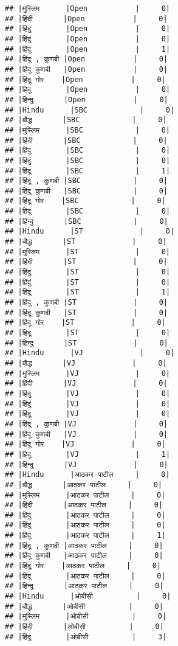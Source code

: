 \documentclass[
]{article}
\begin{document}
\begin{verbatim}
## |मुस्लिम      |Open           |     0|
## |हिंदी       |Open           |     0|
## |हिंदु        |Open           |     0|
## |हिंदुं        |Open           |     0|
## |हिंदू        |Open           |     1|
## |हिंदू , कुणबी |Open           |     0|
## |हिंदू कुणबी   |Open           |     0|
## |हिंदू गोर    |Open           |     0|
## |हिदू        |Open           |     0|
## |हिन्दु       |Open           |     0|
## |Hindu      |SBC            |     0|
## |बौद्ध       |SBC            |     0|
## |मुस्लिम      |SBC            |     0|
## |हिंदी       |SBC            |     0|
## |हिंदु        |SBC            |     0|
## |हिंदुं        |SBC            |     0|
## |हिंदू        |SBC            |     1|
## |हिंदू , कुणबी |SBC            |     0|
## |हिंदू कुणबी   |SBC            |     0|
## |हिंदू गोर    |SBC            |     0|
## |हिदू        |SBC            |     0|
## |हिन्दु       |SBC            |     0|
## |Hindu      |ST             |     0|
## |बौद्ध       |ST             |     0|
## |मुस्लिम      |ST             |     0|
## |हिंदी       |ST             |     0|
## |हिंदु        |ST             |     0|
## |हिंदुं        |ST             |     0|
## |हिंदू        |ST             |     1|
## |हिंदू , कुणबी |ST             |     0|
## |हिंदू कुणबी   |ST             |     0|
## |हिंदू गोर    |ST             |     0|
## |हिदू        |ST             |     0|
## |हिन्दु       |ST             |     0|
## |Hindu      |VJ             |     0|
## |बौद्ध       |VJ             |     0|
## |मुस्लिम      |VJ             |     0|
## |हिंदी       |VJ             |     0|
## |हिंदु        |VJ             |     0|
## |हिंदुं        |VJ             |     0|
## |हिंदू        |VJ             |     0|
## |हिंदू , कुणबी |VJ             |     0|
## |हिंदू कुणबी   |VJ             |     0|
## |हिंदू गोर    |VJ             |     0|
## |हिदू        |VJ             |     1|
## |हिन्दु       |VJ             |     0|
## |Hindu      |आठकर पाटील     |     0|
## |बौद्ध       |आठकर पाटील     |     0|
## |मुस्लिम      |आठकर पाटील     |     0|
## |हिंदी       |आठकर पाटील     |     0|
## |हिंदु        |आठकर पाटील     |     0|
## |हिंदुं        |आठकर पाटील     |     0|
## |हिंदू        |आठकर पाटील     |     1|
## |हिंदू , कुणबी |आठकर पाटील     |     0|
## |हिंदू कुणबी   |आठकर पाटील     |     0|
## |हिंदू गोर    |आठकर पाटील     |     0|
## |हिदू        |आठकर पाटील     |     0|
## |हिन्दु       |आठकर पाटील     |     0|
## |Hindu      |ओबीसी          |     0|
## |बौद्ध       |ओबीसी          |     0|
## |मुस्लिम      |ओबीसी          |     0|
## |हिंदी       |ओबीसी          |     0|
## |हिंदु        |ओबीसी          |     3|

\end{verbatim}
\end{document}
